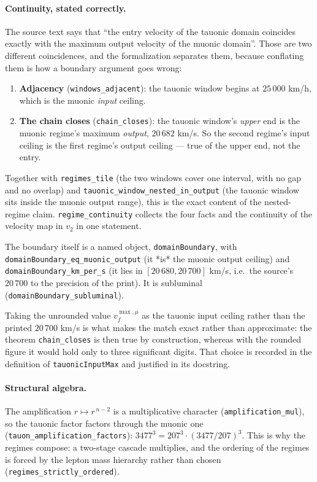 \documentclass[11pt,a4paper]{article}
\begin{document}
\paragraph{Continuity, stated correctly.}
The source text says that ``the entry velocity of the tauonic domain coincides
exactly with the maximum output velocity of the muonic domain''.  Those are two
different coincidences, and the formalization separates them, because conflating
them is how a boundary argument goes wrong:

\begin{enumerate}[leftmargin=*]
\item \textbf{Adjacency} (\texttt{windows\_adjacent}): the tauonic window begins
  at $25\,000$ km/h, which is the muonic \emph{input} ceiling.
\item \textbf{The chain closes} (\texttt{chain\_closes}): the tauonic window's
  \emph{upper} end is the muonic regime's maximum \emph{output}, $20\,682$ km/s.
  So the second regime's input ceiling is the first regime's output ceiling ---
  true of the upper end, not the entry.
\end{enumerate}

Together with \texttt{regimes\_tile} (the two windows cover one interval, with no
gap and no overlap) and \texttt{tauonic\_window\_nested\_in\_output} (the tauonic
window sits inside the muonic output range), this is the exact content of the
nested-regime claim.  \texttt{regime\_continuity} collects the four facts and the
continuity of the velocity map in $v_2$ in one statement.

The boundary itself is a named object, \texttt{domainBoundary}, with
\texttt{domainBoundary\_eq\_muonic\_output} (it *is* the muonic output ceiling)
and \texttt{domainBoundary\_km\_per\_s} (it lies in $[20\,680, 20\,700]$ km/s,
i.e.\ the source's $20\,700$ to the precision of the print).  It is subluminal
(\texttt{domainBoundary\_subluminal}).

Taking the unrounded value $v_f^{\max,\mu}$ as the tauonic input ceiling rather
than the printed $20\,700$ km/s is what makes the match exact rather than
approximate: the theorem \texttt{chain\_closes} is then true by construction,
whereas with the rounded figure it would hold only to three significant digits.
That choice is recorded in the definition of \texttt{tauonicInputMax} and
justified in its docstring.

\paragraph{Structural algebra.}
The amplification $r \mapsto r^{\,n-2}$ is a multiplicative character
(\texttt{amplification\_mul}), so the tauonic factor factors through the muonic
one (\texttt{tauon\_amplification\_factors}):
$3477^3 = 207^3 \cdot (3477/207)^3$.  This is why the regimes compose: a
two-stage cascade multiplies, and the ordering of the regimes is forced by the
lepton mass hierarchy rather than chosen (\texttt{regimes\_strictly\_ordered}).
\end{document}
